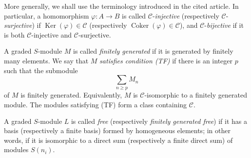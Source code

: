 \label{fac:III:2:no:56:def:C-morphism}
More generally, we shall use the terminology introduced in the cited
article. In particular, a homomorphism $\varphi:A\to B$ is called
$\mathcal{C}$-\textit{injective} (respectively
$\mathcal{C}$-\textit{surjective}) if
$\operatorname{Ker}(\varphi)\in\mathcal{C}$ (respectively
$\operatorname{Coker}(\varphi)\in\mathcal{C}$), and
$\mathcal{C}$-\textit{bijective} if it is both $\mathcal{C}$-injective and
$\mathcal{C}$-surjective.

\label{fac:III:2:no:56:def:TF}
A graded $S$-module $M$ is called \textit{finitely generated} if it is
generated by finitely many elements. We say that $M$ \textit{satisfies condition (TF)}
if there is an integer $p$ such that the submodule
\[
\sum_{n\geq p}M_n
\]
of $M$ is finitely generated. Equivalently, $M$ is
$\mathcal{C}$-isomorphic to a finitely generated module. The modules
satisfying (TF) form a class containing $\mathcal{C}$.

\label{fac:III:2:no:56:def:free-graded-module}
A graded $S$-module $L$ is called \textit{free} (respectively
\textit{finitely generated free}) if it has a basis (respectively a finite
basis) formed by homogeneous elements; in other words, if it is isomorphic
to a direct sum (respectively a finite direct sum) of modules $S(n_i)$.
